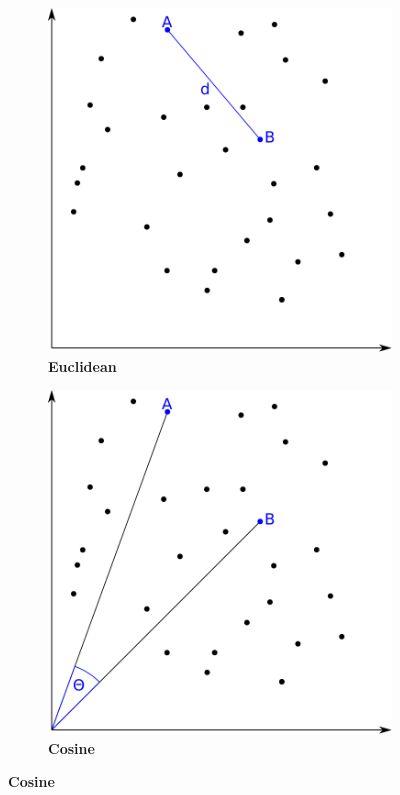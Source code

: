 \begin{figure}
    \centering
    \begin{adjustbox}{minipage=\dimexpr{}\fboxrule,fbox}
        \begin{subfigure}[b]{0.475\textwidth}
            \caption[Euclidean]{\textbf{Euclidean}}
            \label{subfig:Euclidean}
            \includegraphics[width=\textwidth]{Graphics/Euclidean.pdf}
        \end{subfigure}
        \hfill
        \begin{subfigure}[b]{0.475\textwidth}
            \caption[Cosine]{\textbf{Cosine}}
            \label{subfig:Cosinus}            \includegraphics[width=\textwidth]{Graphics/Cosinus.pdf}

\end{subfigure}
\end{adjustbox}
\end{figure}
